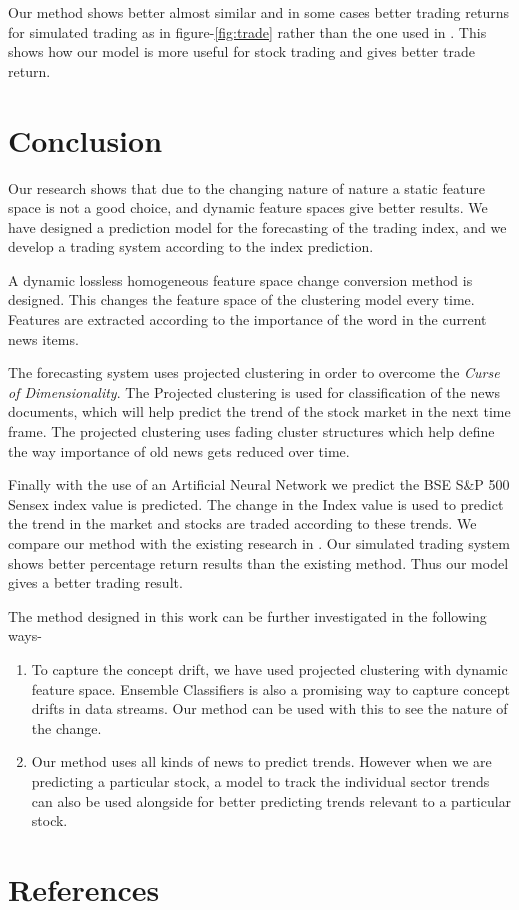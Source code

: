 \documentclass[review,twocolumn,5p]{elsarticle}
\begin{document}
Our method shows better almost similar and in some cases better trading returns for simulated trading as in figure-\ref{fig:trade} rather than the one used in \cite{Hagenau:2013}. This shows how our model is more useful for stock trading and gives better trade return. 


\section{Conclusion}
\label{sec:conclusion}\textbf{}

Our research shows that due to the changing nature of nature a static feature space is not a good choice, and dynamic feature spaces give better results. We have designed a prediction model for the forecasting of the trading index, and we develop a trading system according to the index prediction. 

A dynamic lossless homogeneous feature space change conversion method is designed. This changes the feature space of the clustering model every time. Features are extracted according to the importance of the word in the current news items. 

The forecasting system uses projected clustering in order to overcome the \textit{Curse of Dimensionality}. The Projected clustering is used for classification of the news documents, which will help predict the trend of the stock market in the next time frame. The projected clustering uses fading cluster structures which help define the way importance of old news gets reduced over time.

Finally with the use of an Artificial Neural Network we predict the BSE S\&P 500 Sensex index value is predicted. The change in the Index value is used to predict the trend in the market and stocks are traded according to these trends. We compare our method with the existing research in \cite{Hagenau:2013}. Our simulated trading system shows better percentage return results than the existing method. Thus our model gives a better trading result.

The method designed in this work can be further investigated in the following ways- 
\begin{enumerate}
\item To capture the concept drift, we have used projected clustering with dynamic feature space. Ensemble Classifiers is also a promising way to capture concept drifts in data streams. Our method can be used with this to see the nature of the change.

\item Our method uses all kinds of news to predict trends. However when we are predicting a particular stock, a model to track the individual sector trends can also be used alongside for better predicting trends relevant to a particular stock.
\end{enumerate}
\section*{References}


\end{document}
